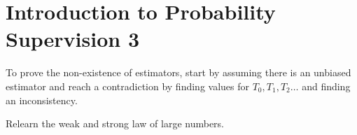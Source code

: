 \documentclass[10pt, a4paper]{article}
\begin{document}
\section*{Introduction to Probability Supervision 3}

To prove the non-existence of estimators, start by assuming there is an unbiased
estimator and reach a contradiction by finding values for $T_0, T_1, T_2 \dots$
and finding an inconsistency.

Relearn the weak and strong law of large numbers.
\end{document}
